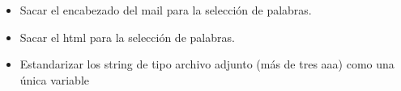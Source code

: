 \documentclass[a4paper,10pt]{article}
\begin{document}
\begin{itemize}
 \item Sacar el encabezado del mail para la selecci\'on de palabras. 
 \item Sacar el html para la selecci\'on de palabras. 
 \item Estandarizar los string de tipo archivo adjunto (m\'as de tres aaa) como una \'unica variable 
\end{itemize}






\scriptsize


\end{document}
